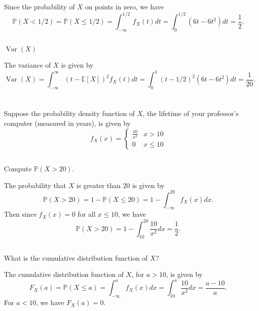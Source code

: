 \documentclass[12pt]{article}
\newenvironment{problem}
    {\begin{lrbox}{\mybox}\begin{minipage}{0.98\textwidth}}
    {\end{minipage}\end{lrbox}\framebox[\textwidth]{\usebox{\mybox}}}
\renewcommand{\P}{\mathbb{P}}
\newcommand{\E}{\mathbb{E}}
\newcommand{\Var}{\operatorname{Var}}
\begin{document}
Since the probability of $X$ on points in zero, we have
\[
    \P(X < 1/2) = \P(X \leq 1/2) = \int_{-\infty}^{1/2} f_X(t) dt = \int_0^{1/2} (6t - 6t^2) dt = \frac12.
\]

\subsection{}
\begin{problem}
    $\Var(X)$
\end{problem}
\medskip

The variance of $X$ is given by
\[
    \Var(X) = \int_{-\infty}^{\infty}(t - \E[X])^2f_X(t) dt = \int_0^1 (t - 1/2)^2 (6t - 6t^2) dt = \frac{1}{20}.
\]

\newpage
\section{}
\begin{problem}
    Suppose the probability density function of $X$, the lifetime of your professor’s computer (measured in years), is given by
    \[
        f_X(x) = \begin{cases}
            \frac{10}{x^2}  & x > 10 \\
            0           & x \leq 10
        \end{cases}
    \]
\end{problem}

\subsection{}
\begin{problem}
    Compute $\P(X > 20)$.
\end{problem}
\medskip

The probability that $X$ is greater than $20$ is given by
\[
    \P(X > 20) = 1 - \P(X \leq 20) = 1 - \int_{-\infty}^{20} f_X(x) dx.
\]
Then since $f_X(x) = 0$ for all $x \leq 10$, we have
\[
    \P(X > 20) = 1 - \int_{10}^{20} \frac{10}{x^2} dx = \frac12.
\]

\subsection{}
\begin{problem}
    What is the cumulative distribution function of $X$?
\end{problem}
\medskip

The cumulative distribution function of $X$, for $a > 10$, is given by
\[
    F_X(a) = \P(X \leq a) = \int_{-\infty}^{a} f_X(x) dx = \int_{10}^{a} \frac{10}{x^2} dx = \frac{a - 10}{a}.
\]
For $a < 10$, we have $F_X(a) = 0$.
\end{document}
